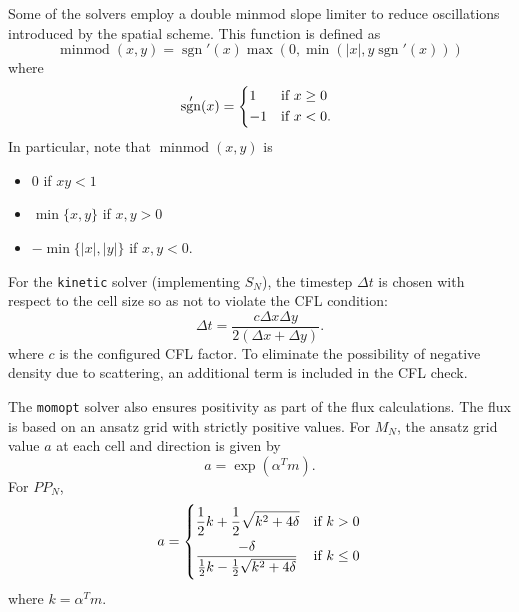 \documentclass{article}
\DeclareMathOperator{\minmod}{minmod}
\DeclareMathOperator{\sgn}{sgn}
\newcommand{\kinetic}{\texttt{kinetic}\xspace}
\newcommand{\momopt}{\texttt{momopt}\xspace}
\begin{document}
Some of the solvers employ a double minmod slope limiter to reduce oscillations
introduced by the spatial scheme. This function is defined as
\begin{equation}
    \minmod (x, y) = \sgn'(x) \max\left(0, \min\left(|x|, y \sgn'(x)\right)\right)
\end{equation}
where
\begin{equation}
    \sgn'(x) =
    \begin{dcases*}
        1  & if $x \geq 0$ \\
        -1 & if $x < 0$.
    \end{dcases*}
\end{equation}
In particular, note that $\minmod (x,y)$ is
\begin{itemize}
    \item 0 if $xy < 1$
    \item $\min\{x, y\}$ if $x,y > 0$
    \item $-\min\{|x|, |y|\}$ if $x,y < 0$.
\end{itemize}

For the \kinetic solver (implementing $S_N$), the timestep
$\Delta t$ is chosen with respect to the cell size so as not to violate
the CFL condition:
\begin{equation}
    \Delta t = \frac{c \Delta x \Delta y}{2(\Delta x + \Delta y)}.
\end{equation}
where $c$ is the configured CFL factor.
To eliminate the possibility of negative density due
to scattering, an additional term is included in the CFL check.

The \momopt solver also ensures positivity as part of the flux calculations.
The flux is based on an ansatz grid with strictly positive values. For $M_N$,
the ansatz grid value $a$ at each cell and direction is given by
\begin{equation}
    a = \exp (\alpha^T m).
\end{equation}
For $PP_N$,
\begin{equation}
a =
\begin{dcases}
    \frac{1}{2}k + \frac{1}{2}\sqrt{k^2 + 4\delta} & \text{if } k > 0 \\
    \frac{-\delta}{\frac{1}{2}k - \frac{1}{2}\sqrt{k^2 + 4\delta}} & \text{if } k \leq 0
\end{dcases}
\end{equation}
where $k = \alpha^T m$.
\end{document}
